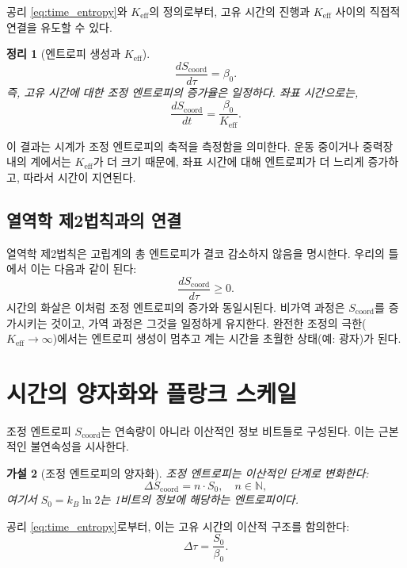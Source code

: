 \documentclass[12pt,a4paper]{article}
\newtheorem{theorem}{정리}[section]
\newtheorem{hypothesis}[theorem]{가설}
\newcommand{\Keff}{K_{\mathrm{eff}}}
\newcommand{\Scoord}{S_{\mathrm{coord}}}
\begin{document}
	공리 \ref{eq:time_entropy}와 \(\Keff\)의 정의로부터, 고유 시간의 진행과 \(\Keff\) 사이의 직접적 연결을 유도할 수 있다.
	
	\begin{theorem}[엔트로피 생성과 \(\Keff\)]
		\[
		\frac{d\Scoord}{d\tau} = \beta_0.
		\]
		즉, 고유 시간에 대한 조정 엔트로피의 증가율은 일정하다. 좌표 시간으로는,
		\[
		\frac{d\Scoord}{dt} = \frac{\beta_0}{\Keff}.
		\]
	\end{theorem}
	
	이 결과는 시계가 조정 엔트로피의 축적을 측정함을 의미한다. 운동 중이거나 중력장 내의 계에서는 \(\Keff\)가 더 크기 때문에, 좌표 시간에 대해 엔트로피가 더 느리게 증가하고, 따라서 시간이 지연된다.
	
	\subsection{열역학 제2법칙과의 연결}
	
	열역학 제2법칙은 고립계의 총 엔트로피가 결코 감소하지 않음을 명시한다. 우리의 틀에서 이는 다음과 같이 된다:
	\begin{equation}
		\frac{d\Scoord}{d\tau} \ge 0.
	\end{equation}
	시간의 화살은 이처럼 조정 엔트로피의 증가와 동일시된다. 비가역 과정은 \(\Scoord\)를 증가시키는 것이고, 가역 과정은 그것을 일정하게 유지한다. 완전한 조정의 극한(\(\Keff \to \infty\))에서는 엔트로피 생성이 멈추고 계는 시간을 초월한 상태(예: 광자)가 된다.
	
	\section{시간의 양자화와 플랑크 스케일}
	\label{sec:quantization}
	
	조정 엔트로피 \(\Scoord\)는 연속량이 아니라 이산적인 정보 비트들로 구성된다. 이는 근본적인 불연속성을 시사한다.
	
	\begin{hypothesis}[조정 엔트로피의 양자화]
		조정 엔트로피는 이산적인 단계로 변화한다:
		\begin{equation}
			\Delta \Scoord = n \cdot S_0, \quad n \in \mathbb{N},
		\end{equation}
		여기서 \(S_0 = k_B \ln 2\)는 1비트의 정보에 해당하는 엔트로피이다.
	\end{hypothesis}
	
	공리 \ref{eq:time_entropy}로부터, 이는 고유 시간의 이산적 구조를 함의한다:
	\begin{equation}
		\Delta \tau = \frac{S_0}{\beta_0}.
	\end{equation}
	
\end{document}
